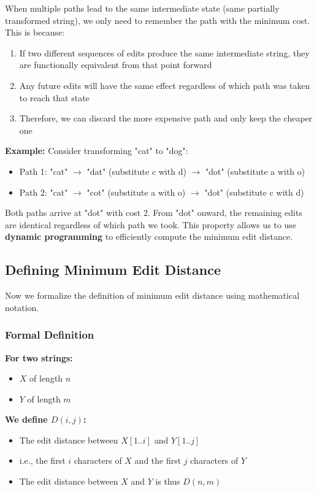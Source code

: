\documentclass[11pt,a4paper]{article}
\theoremstyle{definition}
\theoremstyle{plain}
\theoremstyle{remark}
\begin{document}
When multiple paths lead to the same intermediate state (same partially transformed string), we only need to remember the path with the minimum cost. This is because:

\begin{enumerate}
    \item If two different sequences of edits produce the same intermediate string, they are functionally equivalent from that point forward
    \item Any future edits will have the same effect regardless of which path was taken to reach that state
    \item Therefore, we can discard the more expensive path and only keep the cheaper one
\end{enumerate}

\textbf{Example:} Consider transforming "cat" to "dog":
\begin{itemize}
    \item Path 1: "cat" $\rightarrow$ "dat" (substitute c with d) $\rightarrow$ "dot" (substitute a with o)
    \item Path 2: "cat" $\rightarrow$ "cot" (substitute a with o) $\rightarrow$ "dot" (substitute c with d)
\end{itemize}

Both paths arrive at "dot" with cost 2. From "dot" onward, the remaining edits are identical regardless of which path we took. This property allows us to use \textbf{dynamic programming} to efficiently compute the minimum edit distance.

\subsection{Defining Minimum Edit Distance}

Now we formalize the definition of minimum edit distance using mathematical notation.

\subsubsection{Formal Definition}

\textbf{For two strings:}
\begin{itemize}
    \item $X$ of length $n$
    \item $Y$ of length $m$
\end{itemize}

\textbf{We define $D(i,j)$:}
\begin{itemize}
    \item The edit distance between $X[1..i]$ and $Y[1..j]$
    \item i.e., the first $i$ characters of $X$ and the first $j$ characters of $Y$
    \item The edit distance between $X$ and $Y$ is thus $D(n,m)$
\end{itemize}
\end{document}

